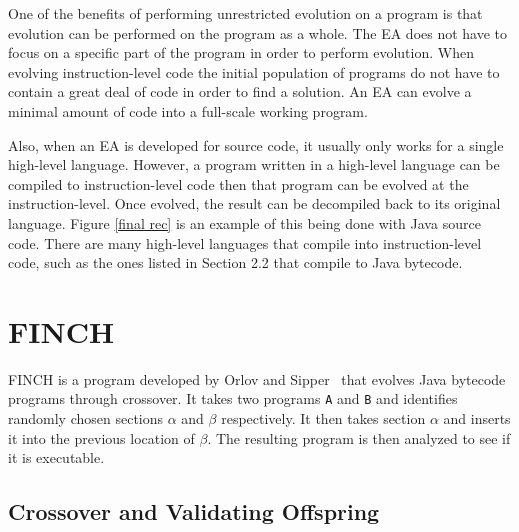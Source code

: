 \documentclass{sig-alternate}
\begin{document}
One of the benefits of performing unrestricted evolution on a program is that evolution can be performed on the program as a whole. The EA does not have to focus on a specific part of the program in order to perform evolution. When evolving instruction-level code the initial population of programs do not have to contain a great deal of code in order to find a solution. An EA can evolve a minimal amount of code into a full-scale working program.\par

Also, when an EA is developed for source code, it usually only works for a single high-level language. However, a program written in a high-level language can be compiled to instruction-level code then that program can be evolved at the instruction-level. Once evolved, the result can be decompiled back to its original language. Figure \ref{final rec} is an example of this being done with Java source code. There are many high-level languages that compile into instruction-level code, such as the ones listed in Section 2.2 that compile to Java bytecode.

\section{FINCH}
FINCH is a program developed by Orlov and Sipper~\cite{FINCH2:2009,FINCH:2011} that evolves Java bytecode programs through crossover. It takes two programs \texttt{A} and \texttt{B} and identifies randomly chosen sections $\alpha$ and $\beta$ respectively. It then takes section $\alpha$ and inserts it into the previous location of $\beta$. The resulting program is then analyzed to see if it is executable.

\subsection{Crossover and Validating Offspring}
\end{document}
